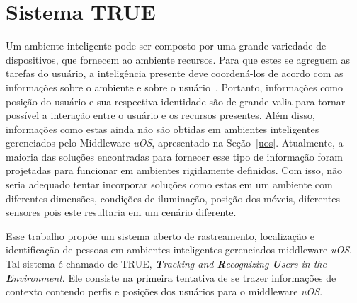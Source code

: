 \chapter{Sistema TRUE}
\label{cap:true}




Um ambiente inteligente pode ser composto por uma grande variedade de dispositivos, que fornecem ao ambiente recursos. Para que estes se agreguem as tarefas do usuário, a inteligência presente deve coordená-los de acordo com as informações sobre o ambiente e sobre o usuário~\cite{fabriciobuzzeto}. Portanto, informações como posição do usuário e sua respectiva identidade são de grande valia para tornar possível a interação entre o usuário e os recursos presentes. Além disso, informações como estas ainda não são obtidas em ambientes inteligentes gerenciados pelo Middleware \textit{uOS}, apresentado na Seção~\ref{uos}. Atualmente, a maioria das soluções encontradas para fornecer esse tipo de informação foram projetadas para funcionar em ambientes rigidamente definidos. Com isso, não seria adequado tentar incorporar soluções como estas em um ambiente com diferentes dimensões, condições de iluminação, posição dos móveis, diferentes sensores pois este resultaria em um cenário diferente.

Esse trabalho propõe um sistema aberto de rastreamento, localização e identificação de pessoas em ambientes inteligentes gerenciados middleware \textit{uOS}. Tal sistema é chamado de TRUE, \textit{\textbf{T}racking and \textbf{R}ecognizing \textbf{U}sers in the \textbf{E}nvironment}. Ele consiste na primeira tentativa de se trazer informações de contexto contendo perfis e posições dos usuários para o middleware \textit{uOS}.



